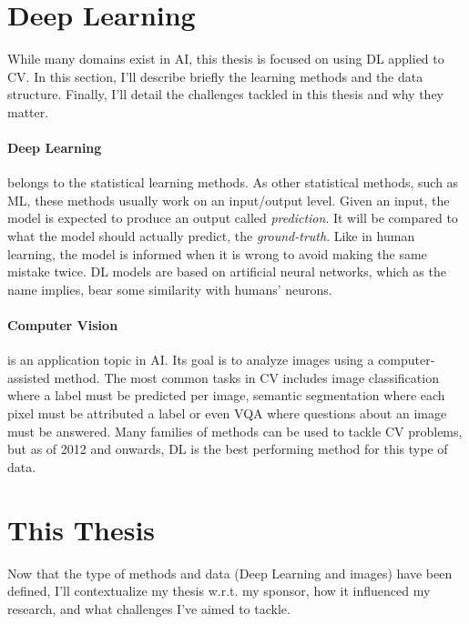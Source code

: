 \section{Deep Learning}

While many domains exist in \acf{AI}, this thesis is focused on using \acf{DL} applied to \acf{CV}.
In this section, I'll describe briefly the learning methods and the data structure.
Finally, I'll detail the challenges tackled in this thesis and why they matter.

\paragraph{Deep Learning} belongs to the statistical learning methods. As other statistical methods,
such as \acf{ML}, these methods usually work on an input/output level. Given an input, the model is
expected to produce an output called \textit{prediction}. It will be compared to what
the model should actually predict, the \textit{ground-truth}. Like in human learning, the model is
informed when it is wrong to avoid making the same mistake twice. \acf{DL} models are based
on artificial neural networks, which as the name implies, bear some similarity with
humans' neurons.

\paragraph{Computer Vision} is an application topic in \acf{AI}. Its goal is to analyze images using
a computer-assisted method. The most common tasks in \acf{CV} includes image classification where a
label must be predicted per image, semantic segmentation where each pixel must be attributed a
label or even \ac{VQA} where questions about an image must be answered. Many families of methods can
be used to tackle \ac{CV} problems, but as of 2012 and onwards, \acf{DL} is the best
performing method for this type of data.

\section{This Thesis}

Now that the type of methods and data (Deep Learning and images) have been defined, I'll
contextualize my thesis w.r.t. my sponsor, how it influenced my research, and what challenges I've
aimed to tackle.

